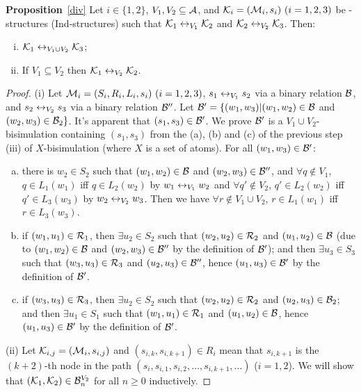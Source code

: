 \documentclass{article}
\begin{document}
\textbf{Proposition}~\ref{div}
Let $i\in \{1,2\}$, $V_1,V_2\subseteq\cal A$,
and ${\cal K}_i=({\cal M}_i,s_i)~(i=1,2,3)$ be \MPK-structures (Ind-structures)
 such that
${\cal K}_1\leftrightarrow_{V_1}{\cal K}_2$ and ${\cal K}_2\leftrightarrow_{V_2}{\cal K}_3$.
 Then:
 \begin{enumerate}[(i)]
   \item ${\cal K}_1\leftrightarrow_{V_1\cup V_2}{\cal K}_3$;
   \item If $V_1 \subseteq V_2$ then ${\cal K}_1 \leftrightarrow_{V_2} {\cal K}_2$.
 \end{enumerate}
\begin{proof}
(i) Let ${\cal M}_i=(S_i,R_i,L_i,s_i)~(i=1,2,3)$, $s_1 \leftrightarrow_{V_1} s_2$ via a binary relation ${\cal B}$, and $s_2 \leftrightarrow_{V_2} s_3$ via a binary relation ${\cal B}''$. Let ${\cal B}' = \{(w_1, w_3)| (w_1, w_2)\in {\cal B}$ and $(w_2, w_3)\in {\cal B}_2\}$. It's apparent that $(s_1, s_3) \in {\cal B}'$. We prove ${\cal B}'$ is a $V_1 \cup V_2$-bisimulation containing $(s_1, s_3)$ from the (a), (b) and (c) of the previous step (iii) of $X$-bisimulation (where $X$ is a set of atoms). For all $(w_1, w_3) \in {\cal B}'$:
\begin{enumerate}[(a)]
  \item there is $w_2 \in S_2$ such that $(w_1,w_2)\in {\cal B}$ and $(w_2, w_3)\in {\cal B}''$, and $\forall q \notin V_1$, $q \in L_1(w_1)$ iff $q \in L_2(w_2)$ by $w_1 \leftrightarrow_{V_1} w_2$ and $\forall q' \notin V_2$, $q'\in L_2(w_2)$ iff $q'\in L_3(w_3)$ by $w_2 \leftrightarrow_{V_2} w_3$. Then we have $\forall r\notin V_1 \cup V_2$, $r \in L_1(w_1)$ iff $r \in L_3(w_3)$.
  \item if $(w_1, u_1) \in {\cal R}_1$, then $\exists u_2\in S_2$ such that $(w_2, u_2) \in {\cal R}_2$ and $(u_1,u_2)\in {\cal B}$ (due to $(w_1,w_2)\in {\cal B}$ and $(w_2, w_3) \in {\cal B}''$ by the definition of ${\cal B}'$); and then $\exists u_3 \in S_3$ such that $(w_3, u_3) \in {\cal R}_3$ and $(u_2, u_3) \in {\cal B}''$, hence $(u_1, u_3) \in {\cal B}'$ by the definition of ${\cal B}'$.
  \item if $(w_3, u_3) \in {\cal R}_3$, then $\exists u_2\in S_2$ such that $(w_2, u_2) \in {\cal R}_2$ and $(u_2, u_3) \in {\cal B}_2$; and then $\exists u_1 \in S_1$ such that $(w_1, u_1) \in {\cal R}_1$ and $(u_1, u_2) \in {\cal B}$, hence $(u_1, u_3) \in {\cal B}'$ by the definition of ${\cal B}'$.
\end{enumerate}

(ii)  Let ${\cal K}_{i, j}=({\cal M}_i, s_{i,j})$ and $(s_{i, k}, s_{i, k+1}) \in R_i$ mean that $s_{i, k+1}$ is the $(k+2)$-th node in the path
 $(s_i, s_{i, 1}, s_{i,2}, \dots , s_{i, k+1}, \dots)$ ($i=1,2$).
We will show that $({\cal K}_1, {\cal K}_2) \in {\cal B}_n^{V_2}$ for all $n \ge 0$ inductively.


\end{proof}
\end{document}
